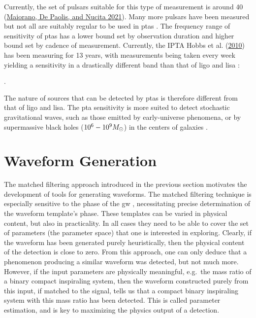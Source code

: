 \documentclass[
  11pt,
  a4paper,
  DIV=11,
  numbers=noendperiod,
  oneside]{scrreprt}
\let\[\relax \let\]\relax %
\DeclareRobustCommand{\[}{\begin{equation}}
\DeclareRobustCommand{\]}{\end{equation}}
\begin{document}
Currently, the set of pulsars suitable for this type of measurement is
around 40 (\protect\hyperlink{ref-Maiorano:2021}{Maiorano, De Paolis,
and Nucita 2021}). Many more pulsars have been measured but not all are
suitably regular to be used in \glspl{pta} . The frequency range of
sensitivity of \glspl{pta} has a lower bound set by observation duration
and higher bound set by cadence of measurement. Currently, the IPTA
Hobbs et al. (\protect\hyperlink{ref-Hobbs:2009yy}{2010}) has been
measuring for 13 years, with measurements being taken every week
yielding a sensitivity in a drastically different band than that of
\gls{ligo} and \gls{lisa} :

\[
.
\]

The nature of sources that can be detected by \glspl{pta} is therefore
different from that of \gls{ligo} and \gls{lisa}. The \gls{pta}
sensitivity is more suited to detect stochastic gravitational waves,
such as those emitted by early-universe phenomena, or by supermassive
black holes (\(10^6-10^9M_\odot\)) in the centers of galaxies
.


\hypertarget{sec-wfgen}{%
\chapter{Waveform Generation}\label{sec-wfgen}}

The matched filtering approach introduced in the previous section
motivates the development of tools for generating waveforms. The matched
filtering technique is especially sensitive to the phase of the \gls{gw}
, necessitating precise determination of the waveform template's phase.
These templates can be varied in physical content, but also in
practicality. In all cases they need to be able to cover the set of
parameters (the parameter space) that one is interested in exploring.
Clearly, if the waveform has been generated purely heuristically, then
the physical content of the detection is close to zero. From this
approach, one can only deduce that a phenomenon producing a similar
waveform was detected, but not much more. However, if the input
parameters are physically meaningful, e.g.~the mass ratio of a binary
compact inspiraling system, then the waveform constructed purely from
this input, if matched to the signal, tells us that a compact binary
inspiraling system with this mass ratio has been detected. This is
called parameter estimation, and is key to maximizing the physics output
of a detection.
\end{document}
